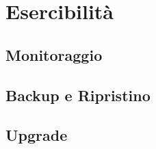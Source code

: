 
\pagestyle{IHA-fancy-style}
\chapter{Esercibilità}
\label{cap:esercibilità}

\section{Monitoraggio}

\section{Backup e Ripristino}

\section{Upgrade}
